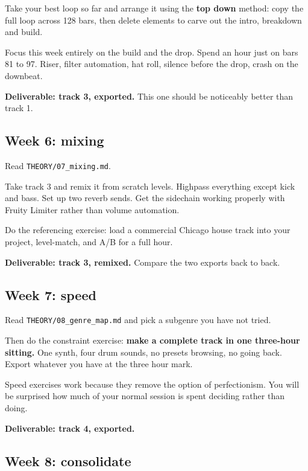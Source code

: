 Take your best loop so far and arrange it using the \textbf{top down} method: copy the full loop
across 128 bars, then delete elements to carve out the intro, breakdown and build.

Focus this week entirely on the build and the drop. Spend an hour just on bars 81 to 97.
Riser, filter automation, hat roll, silence before the drop, crash on the downbeat.

\textbf{Deliverable: track 3, exported.} This one should be noticeably better than track 1.

\subsection{Week 6: mixing}\label{pr01_eight_weeks-week-6-mixing}

Read \texttt{THEORY/07\_mixing.md}.

Take track 3 and remix it from scratch levels. Highpass everything except kick and bass. Set
up two reverb sends. Get the sidechain working properly with Fruity Limiter rather than
volume automation.

Do the referencing exercise: load a commercial Chicago house track into your project,
level-match, and A/B for a full hour.

\textbf{Deliverable: track 3, remixed.} Compare the two exports back to back.

\subsection{Week 7: speed}\label{pr01_eight_weeks-week-7-speed}

Read \texttt{THEORY/08\_genre\_map.md} and pick a subgenre you have not tried.

Then do the constraint exercise: \textbf{make a complete track in one three-hour sitting.} One
synth, four drum sounds, no presets browsing, no going back. Export whatever you have at the
three hour mark.

Speed exercises work because they remove the option of perfectionism. You will be surprised
how much of your normal session is spent deciding rather than doing.

\textbf{Deliverable: track 4, exported.}

\subsection{Week 8: consolidate}\label{pr01_eight_weeks-week-8-consolidate}

